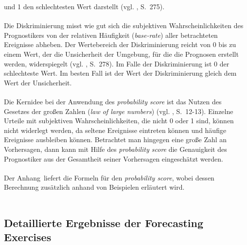 und 1 den schlechtesten Wert darstellt (vgl. \cite{Tetlock}, S.~275). \\ \\
Die Diskriminierung misst wie gut sich die subjektiven Wahrscheinlichkeiten des 
Prognostikers von der relativen Häufigkeit (\emph{base-rate}) aller betrachteten
Ereignisse abheben. Der Wertebereich der Diskriminierung reicht von 0 bis zu
einem Wert, der die Unsicherheit der Umgebung, für die die Prognosen erstellt
werden, widerspiegelt (vgl. \cite{Tetlock}, S.~278). Im Falle der
Diskriminierung ist 0 der schlechteste Wert. Im besten Fall ist der Wert der
Diskriminierung gleich dem Wert der Unsicherheit. \\ \\
Die Kernidee bei der Anwendung des \emph{probability score} ist das Nutzen
des Gesetzes der großen Zahlen (\emph{law of large numbers})
(vgl. \cite{Tetlock}, S.~12-13). Einzelne Urteile mit subjektiven
Wahrscheinlichkeiten, die nicht 0 oder 1 sind, können nicht widerlegt werden,
da seltene Ereignisse eintreten können und häufige Ereignisse ausbleiben können.
Betrachtet man hingegen eine große Zahl an Vorhersagen, dann kann mit Hilfe
des \emph{probability score} die Genauigkeit des Prognostiker aus der Gesamtheit
seiner Vorhersagen eingeschätzt werden. \\ \\
Der Anhang~\xcom liefert die Formeln für den \emph{probability score}, wobei
dessen Berechnung zusätzlich anhand von Beispielen erläutert wird. \\ \\

\subsection{Detaillierte Ergebnisse der Forecasting Exercises}

